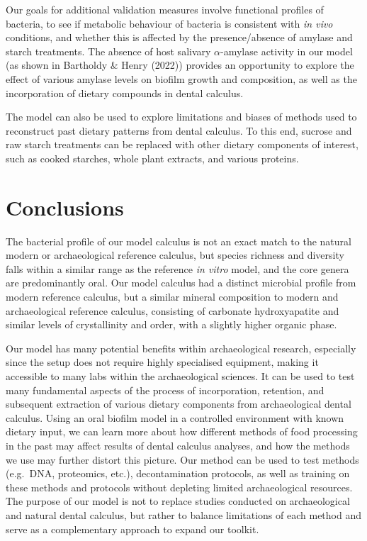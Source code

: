 \documentclass[
]{article}
\begin{document}
Our goals for additional validation measures involve functional profiles
of bacteria, to see if metabolic behaviour of bacteria is consistent
with \emph{in vivo} conditions, and whether this is affected by the
presence/absence of amylase and starch treatments. The absence of host
salivary \(\alpha\)-amylase activity in our model (as shown in Bartholdy
\& Henry (2022)) provides an opportunity to explore the effect of
various amylase levels on biofilm growth and composition, as well as the
incorporation of dietary compounds in dental calculus.

The model can also be used to explore limitations and biases of methods
used to reconstruct past dietary patterns from dental calculus. To this
end, sucrose and raw starch treatments can be replaced with other
dietary components of interest, such as cooked starches, whole plant
extracts, and various proteins.

\hypertarget{conclusions}{%
\section{Conclusions}\label{conclusions}}

The bacterial profile of our model calculus is not an exact match to the
natural modern or archaeological reference calculus, but species
richness and diversity falls within a similar range as the reference
\emph{in vitro} model, and the core genera are predominantly oral. Our
model calculus had a distinct microbial profile from modern reference
calculus, but a similar mineral composition to modern and archaeological
reference calculus, consisting of carbonate hydroxyapatite and similar
levels of crystallinity and order, with a slightly higher organic phase.

Our model has many potential benefits within archaeological research,
especially since the setup does not require highly specialised
equipment, making it accessible to many labs within the archaeological
sciences. It can be used to test many fundamental aspects of the process
of incorporation, retention, and subsequent extraction of various
dietary components from archaeological dental calculus. Using an oral
biofilm model in a controlled environment with known dietary input, we
can learn more about how different methods of food processing in the
past may affect results of dental calculus analyses, and how the methods
we use may further distort this picture. Our method can be used to test
methods (e.g.~DNA, proteomics, etc.), decontamination protocols, as well
as training on these methods and protocols without depleting limited
archaeological resources. The purpose of our model is not to replace
studies conducted on archaeological and natural dental calculus, but
rather to balance limitations of each method and serve as a
complementary approach to expand our toolkit.
\end{document}

